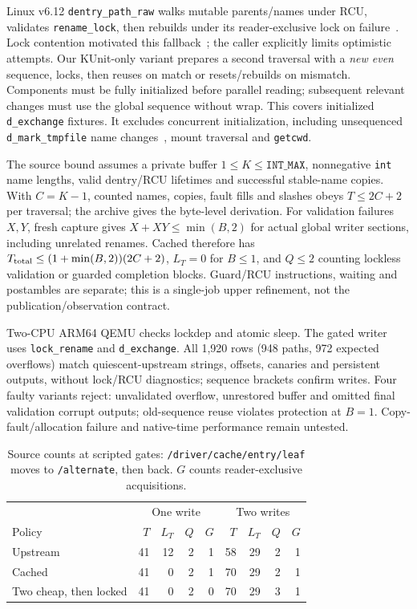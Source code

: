 \documentclass[acmsmall,screen,review,anonymous]{acmart}
\begin{document}
Linux v6.12 \texttt{dentry\_path\_raw} walks mutable parents/names under RCU, validates \texttt{rename\_lock}, then rebuilds under its reader-exclusive lock on failure~\cite{linuxDpath}. Lock contention motivated this fallback~\cite{linuxPathChange}; the caller explicitly limits optimistic attempts. Our KUnit-only variant prepares a second traversal with a \emph{new even} sequence, locks, then reuses on match or resets/rebuilds on mismatch. Components must be fully initialized before parallel reading; subsequent relevant changes must use the global sequence without wrap. This covers initialized \texttt{d\_exchange} fixtures. It excludes concurrent initialization, including unsequenced \texttt{d\_mark\_tmpfile} name changes~\cite{linuxDcache}, mount traversal and \texttt{getcwd}.

The source bound assumes a private buffer $1\le K\le\mathtt{INT\_MAX}$, nonnegative \texttt{int} name lengths, valid dentry/RCU lifetimes and successful stable-name copies. With $C=K-1$, counted names, copies, fault fills and slashes obeys $T\le 2C+2$ per traversal; the archive gives the byte-level derivation. For validation failures $X,Y$, fresh capture gives $X+XY\le\min(B, 2)$ for actual global writer sections, including unrelated renames. Cached therefore has $T_{\rm total}\le(1+\min(B, 2))(2C+2)$, $L_T=0$ for $B\le 1$, and $Q\le 2$ counting lockless validation or guarded completion blocks. Guard/RCU instructions, waiting and postambles are separate; this is a single-job upper refinement, not the publication/observation contract.

Two-CPU ARM64 QEMU checks lockdep and atomic sleep. The gated writer uses \texttt{lock\_rename} and \texttt{d\_exchange}. All 1,920 rows (948 paths, 972 expected overflows) match quiescent-upstream strings, offsets, canaries and persistent outputs, without lock/RCU diagnostics; sequence brackets confirm writes. Four faulty variants reject: unvalidated overflow, unrestored buffer and omitted final validation corrupt outputs; old-sequence reuse violates protection at $B=1$. Copy-fault/allocation failure and native-time performance remain untested.

\begin{table}[ht]
\caption{Source counts at scripted gates: \texttt{/driver/cache/entry/leaf} moves to \texttt{/alternate}, then back. $G$ counts reader-exclusive acquisitions.}
\label{tab:linux}\centering\small
\begin{tabular}{lrrrr|rrrr}
\toprule
&\multicolumn{4}{c|}{One write}&\multicolumn{4}{c}{Two writes}\\
Policy &$T$&$L_T$&$Q$&$G$&$T$&$L_T$&$Q$&$G$\\
\midrule
Upstream &41&12&2&1&58&29&2&1\\
Cached &41&0&2&1&70&29&2&1\\
Two cheap, then locked &41&0&2&0&70&29&3&1\\
\bottomrule
\end{tabular}
\end{table}
\end{document}
